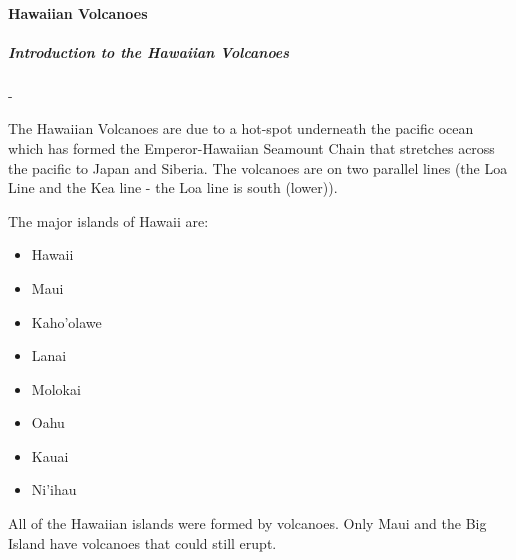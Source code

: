 \documentclass[12pt]{book}
\begin{document}
			\paragraph{Hawaiian Volcanoes}
				\subparagraph{Introduction to the Hawaiian Volcanoes} - 

					The Hawaiian Volcanoes are due to a hot-spot underneath the pacific ocean which has formed the Emperor-Hawaiian Seamount Chain that stretches across the pacific to Japan and Siberia.  The volcanoes are on two parallel lines (the Loa Line and the Kea line - the Loa line is south (lower)).   

					The major islands of Hawaii are: 
					\begin{multicols}{2}
					\begin{itemize}
						\item Hawaii
						\item Maui
						\item Kaho'olawe
						\item Lanai
						\item Molokai
						\item Oahu
						\item Kauai
						\item Ni'ihau
					\end{itemize}
					\end{multicols}
					All of the Hawaiian islands were formed by volcanoes.  Only Maui and the Big Island have volcanoes that could still erupt.  

					\vspace{0.1in}
\end{document}
